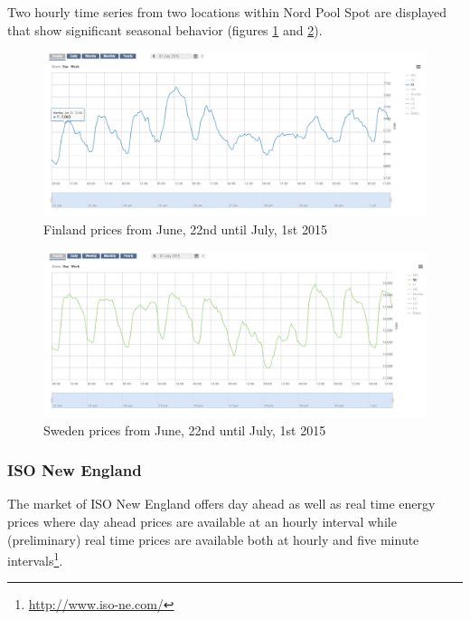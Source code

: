 Two hourly time series from two locations within Nord Pool Spot are displayed that show significant seasonal behavior (figures \ref{fig:hourly_prices_finland} and \ref{fig:hourly_prices_sweden}).

\begin{figure}[!h]
	\centering
		\includegraphics[width=1.00\textwidth]{figures/methodology/hourly_prices_finland.PNG}
	\caption{Finland prices from June, 22nd until July, 1st 2015}
	\label{fig:hourly_prices_finland}
\end{figure}

\begin{figure}[!h]
	\centering
		\includegraphics[width=1.00\textwidth]{figures/methodology/hourly_prices_sweden.PNG}
	\caption{Sweden prices from June, 22nd until July, 1st 2015}
	\label{fig:hourly_prices_sweden}
\end{figure}





\subsubsection{ISO New England}

The market of ISO New England offers day ahead as well as real time energy prices where day ahead prices are available at an hourly interval while (preliminary) real time prices are available both at hourly and five minute intervals\footnote{\url{http://www.iso-ne.com/}}. 

